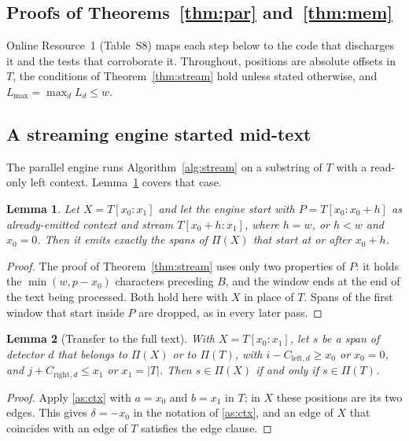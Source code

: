 \documentclass[pdflatex,sn-mathphys-num]{sn-jnl}
\theoremstyle{thmstyleone}
\newtheorem{lemma}{Lemma}
\theoremstyle{thmstylethree}
\begin{document}
\begin{appendices}

\section{Proofs of Theorems~\ref{thm:par} and~\ref{thm:mem}}\label{app:proofs}

Online Resource~1 (Table~S8) maps each step below to the code that discharges it and the tests that corroborate it. Throughout, positions are absolute offsets in $T$, the conditions of Theorem~\ref{thm:stream} hold unless stated otherwise, and $L_{\max} = \max_d L_d \le w$.

\subsection{A streaming engine started mid-text}

The parallel engine runs Algorithm~\ref{alg:stream} on a substring of $T$ with a read-only left context. Lemma~\ref{lem:mid} covers that case.

\begin{lemma}\label{lem:mid}
Let $X = T[x_0{:}x_1]$ and let the engine start with $P = T[x_0{:}x_0 + h]$ as already-emitted context and stream $T[x_0 + h : x_1]$, where $h = w$, or $h < w$ and $x_0 = 0$. Then it emits exactly the spans of $\Pi(X)$ that start at or after $x_0 + h$.
\end{lemma}

\begin{proof}
The proof of Theorem~\ref{thm:stream} uses only two properties of $P$: it holds the $\min(w, p - x_0)$ characters preceding $B$, and the window ends at the end of the text being processed. Both hold here with $X$ in place of $T$. Spans of the first window that start inside $P$ are dropped, as in every later pass.
\end{proof}

\begin{lemma}[Transfer to the full text]\label{lem:transfer}
With $X = T[x_0{:}x_1]$, let $s$ be a span of detector $d$ that belongs to $\Pi(X)$ or to $\Pi(T)$, with $i - C_{\mathrm{left},d} \ge x_0$ or $x_0 = 0$, and $j + C_{\mathrm{right},d} \le x_1$ or $x_1 = |T|$. Then $s \in \Pi(X)$ if and only if $s \in \Pi(T)$.
\end{lemma}

\begin{proof}
Apply \ref{as:ctx} with $a = x_0$ and $b = x_1$ in $T$; in $X$ these positions are its two edges. This gives $\delta = -x_0$ in the notation of \ref{as:ctx}, and an edge of $X$ that coincides with an edge of $T$ satisfies the edge clause.
\end{proof}


\end{appendices}
\end{document}
